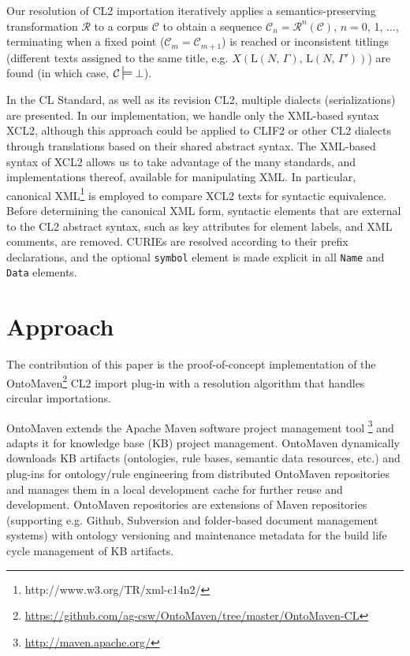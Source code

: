 \documentclass{IOS-Book-Article}
\newcommand{\corp}{ \mathcal{C} }
\newcommand{\ttlOp}[2]{\mathrm{L}(\text{$#1$, $#2$})}
\newcommand{\algo}{\mathcal{R}}
\newcommand{\algopow}[1]{\algo^{#1}}
\newcommand{\algopowone}[2]{\algopow{#1}(#2)}
\newcommand{\mdpf}{\ensuremath{\sdtstile[ss]{}{}}}
\begin{document}
Our resolution of CL2 importation iteratively applies a semantics-preserving transformation $\algo$
to a corpus $\corp$ to obtain a sequence $\corp_n = \algopowone{n}{\corp}$, $n=$0, 1, $\ldots$, terminating when a fixed point ($\corp_m = \corp_{m+1}$) is reached or inconsistent titlings (different texts assigned to the same title, e.g. $X(\text{$\ttlOp{N}{\Gamma}$, $\ttlOp{N}{\Gamma'}$})$) are found (in which case, $\corp \mdpf \bot$).

In the CL Standard, as well as its revision CL2, multiple dialects (serializations) are presented.
In our implementation, we handle only the XML-based syntax XCL2, although this approach
could be applied to CLIF2 or other CL2 dialects through translations based on their shared abstract syntax.
The XML-based syntax of XCL2 allows us to take advantage of the many standards, and implementations thereof, available for manipulating XML. 
In particular, canonical XML\footnote{http://www.w3.org/TR/xml-c14n2/} is employed to compare XCL2 texts for syntactic equivalence.
Before determining the canonical XML form, syntactic elements that are external to the CL2 abstract syntax, such as key attributes for element labels, and XML comments, are removed. CURIEs are resolved according to their prefix declarations, and the optional \texttt{symbol} element is made explicit in all \texttt{Name} and \texttt{Data} elements.


\section{Approach}
\label{approach}
The contribution of this paper is the proof-of-concept implementation of the OntoMaven\footnote{\url{https://github.com/ag-csw/OntoMaven/tree/master/OntoMaven-CL}} CL2 import plug-in with a resolution algorithm that handles circular importations. 

OntoMaven \cite{Paschke13a, Paschke13b, Paschke13c} extends the Apache Maven software project management tool \footnote{\url{http://maven.apache.org/}} and adapts it for knowledge base (KB) project management. 
OntoMaven dynamically downloads KB artifacts (ontologies, rule bases, semantic data resources, etc.) and plug-ins for ontology/rule engineering from distributed OntoMaven repositories and manages them in a local development cache for further reuse and development. 
OntoMaven repositories are extensions of Maven repositories (supporting e.g. Github, Subversion and folder-based document management systems) with ontology versioning and maintenance metadata for the build life cycle management of KB artifacts. 
\end{document}

